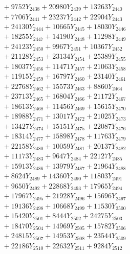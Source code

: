\documentclass[a4paper,10pt]{article}
\begin{document}
{\begin{align}
&\;  + 9752 Y_{2438} + 20980 Y_{2439} + 13263 Y_{2440} \\[0.3ex]
&\;  + 7706 Y_{2441} + 23237 Y_{2442} + 22904 Y_{2443} \\[0.3ex]
&\;  + 24130 Y_{2444} + 10665 Y_{2445} + 18030 Y_{2446} \\[0.3ex]
&\;  + 18255 Y_{2447} + 14190 Y_{2448} + 11298 Y_{2449} \\[0.3ex]
&\;  + 24123 Y_{2450} + 9967 Y_{2451} + 10367 Y_{2452} \\[0.3ex]
&\;  + 21128 Y_{2453} + 23134 Y_{2454} + 25389 Y_{2455} \\[0.3ex]
&\;  + 18037 Y_{2456} + 11471 Y_{2457} + 21063 Y_{2458} \\[0.5ex]\allowbreak
&\;  + 11915 Y_{2459} + 16797 Y_{2460} + 23140 Y_{2461} \\[0.3ex]
&\;  + 22768 Y_{2462} + 15573 Y_{2463} + 8860 Y_{2464} \\[0.3ex]
&\;  + 23713 Y_{2465} + 16804 Y_{2466} + 21172 Y_{2467} \\[0.3ex]
&\;  + 18613 Y_{2468} + 11456 Y_{2469} + 15615 Y_{2470} \\[0.3ex]
&\;  + 18988 Y_{2471} + 13017 Y_{2472} + 21025 Y_{2473} \\[0.3ex]
&\;  + 13427 Y_{2474} + 15151 Y_{2475} + 22087 Y_{2476} \\[0.3ex]
&\;  + 18314 Y_{2477} + 15898 Y_{2478} + 11763 Y_{2479} \\[0.3ex]
&\;  + 22158 Y_{2480} + 10059 Y_{2481} + 20137 Y_{2482} \\[0.3ex]
&\;  + 11173 Y_{2483} + 9647 Y_{2484} + 22127 Y_{2485} \\[0.3ex]
&\;  + 15913 Y_{2486} + 13979 Y_{2487} + 21964 Y_{2488} \\[0.5ex]\allowbreak
&\;  + 8624 Y_{2489} + 14360 Y_{2490} + 11803 Y_{2491} \\[0.3ex]
&\;  + 9650 Y_{2492} + 22868 Y_{2493} + 17965 Y_{2494} \\[0.3ex]
&\;  + 17967 Y_{2495} + 21928 Y_{2496} + 15696 Y_{2497} \\[0.3ex]
&\;  + 19136 Y_{2498} + 10668 Y_{2499} + 11530 Y_{2500} \\[0.3ex]
&\;  + 15420 Y_{2501} + 8444 Y_{2502} + 24275 Y_{2503} \\[0.3ex]
&\;  + 18470 Y_{2504} + 14969 Y_{2505} + 15782 Y_{2506} \\[0.3ex]
&\;  + 24815 Y_{2507} + 14953 Y_{2508} + 23544 Y_{2509} \\[0.3ex]
&\;  + 22186 Y_{2510} + 22632 Y_{2511} + 9284 Y_{2512} \\[0.3ex]

\end{align}}
\end{document}
